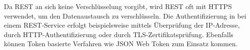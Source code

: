 
Da REST an sich keine Verschlüsselung vorgibt, wird REST oft mit HTTPS verwendet, um den Datenaustausch zu verschlüsseln. Die Authentifizierung in bei einem REST-Service erfolgt beispielsweise mittels Überprüfung der IP-Adresse, durch HTTP-Authentifizierung oder durch TLS-Zertifikatsprüfung. Ebenfalls können Token basierte Verfahren wie JSON Web Token zum Einsatz kommen. \cite{WikiREST}